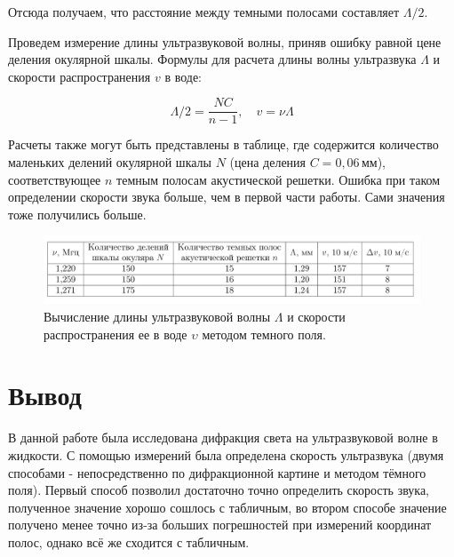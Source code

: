 \documentclass[a4paper,12pt]{article}
\begin{document}
Отсюда получаем, что расстояние между темными полосами составляет $ \Lambda/2 $.

Проведем измерение длины ультразвуковой волны, приняв ошибку равной цене деления окулярной шкалы. Формулы для расчета длины волны ультразвука $ \Lambda $ и скорости распространения $ v $ в воде:

\begin{equation}\label{wave_speed}
\Lambda/2 = \dfrac{NC}{n - 1}, \quad v = \nu \Lambda
\end{equation}

Расчеты также могут быть представлены в таблице, где содержится количество маленьких делений окулярной шкалы $ N $ (цена деления $ C = 0,06 \, \text{мм} $), соответствующее $ n $ темным полосам акустической решетки. Ошибка при таком определении скорости звука больше, чем в первой части работы. Сами значения тоже получились больше.

	\begin{figure}[h!]
		\centering	
		\includegraphics[width=1\textwidth]{5.png}
		\caption{Вычисление длины ультразвуковой волны $\Lambda$ и скорости распространения ее в воде $\upsilon$ методом темного поля.}
		\label{diff}
	\end{figure} 
    \section*{Вывод}
В данной работе была исследована дифракция света на ультразвуковой волне в жидкости. С помощью измерений была определена скорость ультразвука (двумя способами - непосредственно по дифракционной картине и методом тёмного поля). Первый способ позволил достаточно точно определить скорость звука, полученное значение хорошо сошлось с табличным, во втором способе значение получено менее точно из-за больших погрешностей при измерений координат полос, однако всё же сходится с табличным.
\end{document}

